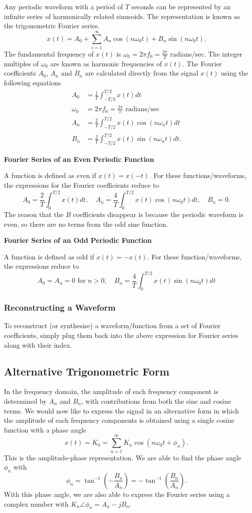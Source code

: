\documentclass{article}
\begin{document}
Any periodic waveform with a period of $T$ seconds can be represented by an infinite series of harmonically related sinusoids. The representation is known as the trigonometric Fourier series.
\[
    x(t)=A_0+\sum_{i=1}^{\infty} A_n\cos(n\omega _0t)+B_n\sin(n\omega _0t).
\]
The fundamental frequency of $x(t)$ is $\omega _0=2\pi f_0=\frac{2\pi }{T}$ radians/sec. The integer multiples of $\omega_0$ are known as harmonic frequencies of $x(t)$. The Fourier coefficients $A_0$, $A_n$ and $B_n$ are calculated directly from the signal $x(t)$ using the following equations
\begin{align*}
    A_0 &= \frac{1}{T}\int_{-T/2}^{T/2}x(t)dt \\
    \omega _0&=2\pi f_0=\frac{2\pi }{r}\text{ radians/sec} \\
    A_n&=\frac{2}{T}\int_{-T/2}^{T/2}x(t)\cos(n\omega _nt)dt\\
    B_n&=\frac{2}{T}\int_{-T/2}^{T/2}x(t)\sin(n\omega _nt)dt.
\end{align*}

\noindent\textbf{Fourier Series of an Even Periodic Function}

A function is defined as even if $x(t)=x(-t)$. For these functions/waveforms, the expressions for the Fourier coefficients reduce to
\[
    A_0=\frac{2}{T}\int_0^{T/2}x(t)dt,\quad A_n=\frac{4}{T}\int_0^{T/2}x(t)\cos(n\omega _0t)dt,\quad B_n=0.
\]
The reason that the $B$ coefficients disappear is because the periodic waveform is even, so there are no terms from the odd sine function.

\noindent \textbf{Fourier Series of an Odd Periodic Function}

A function is defined as odd if $x(t)=-x(t)$. For these function/waveforms, the expressions reduce to
\[
    A_0=A_n=0 \text{ for } n>0,\quad B_n=\frac{4}{T}\int_0^{T/2}x(t)\sin(n\omega _0t)dt
\]

\subsubsection{Reconstructing a Waveform}
To reconstruct (or synthesise) a waveform/function from a set of Fourier coefficients, simply plug them back into the above expression for Fourier series along with their index.

\subsection{Alternative Trigonometric Form}
In the frequency domain, the amplitude of each frequency component is determined by $A_n$ and $B_n$, with contributions from both the sine and cosine terms. We would now like to express the signal in an alternative form in which the amplitude of each frequency components is obtained using a single cosine function with a phase angle
\[
    x(t)=K_0=\sum_{n=1}^{\infty} K_n\cos(n\omega_0t+\phi _n).
\]
This is the amplitude-phase representation. We are able to find the phase angle $\phi _n$ with
\[
    \phi _n=\tan^{-1}\left( -\frac{B_n}{A_n} \right)=-\tan^{-1}\left( \frac{B_n}{A_n} \right).
\]
With this phase angle, we are also able to express the Fourier series using a complex number with $K_n\angle\phi _n=A_n-jB_n$.
\end{document}
